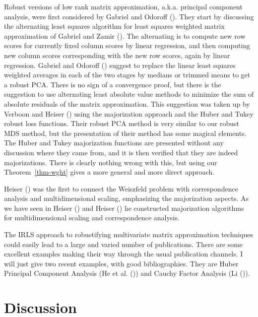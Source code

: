 \documentclass[
  12pt,
  letterpaper,
  DIV=11,
  numbers=noendperiod]{scrartcl}
\newcommand{\sectionbreak}{\pagebreak}
\theoremstyle{plain}
\theoremstyle{plain}
\theoremstyle{plain}
\theoremstyle{definition}
\theoremstyle{definition}
\theoremstyle{remark}
\begin{document}
Robust versions of low rank matrix approximation, a.k.a. principal
component analysis, were first considered by Gabriel and Odoroff
(). They start by discussing the
alternating least squares algorithm for least squares weighted matrix
approximation of Gabriel and Zamir
(). The alternating is to compute
new row scores for currently fixed column scores by linear regression,
and then computing new column scores corresponding with the new row
scores, again by linear regression. Gabriel and Odoroff
() suggest to replace the linear
least squares weighted averages in each of the two stages by medians or
trimmed means to get a robust PCA. There is no sign of a convergence
proof, but there is the suggestion to use alternating least absolute
value methods to minimize the sum of absolute residuals of the matrix
approximation. This suggestion was taken up by Verboon and Heiser
() using the majorization approach
and the Huber and Tukey robust loss functions. Their robust PCA method
is very similar to our robust MDS method, but the presentation of their
method has some magical elements. The Huber and Tukey majorization
functions are presented without any discussion where they came from, and
it is then verified that they are indeed majorizations. There is clearly
nothing wrong with this, but using our Theorem~\ref{thm-wght} gives a
more general and more direct approach.

Heiser () was the first to connect the
Weiszfeld problem with correspondence analysis and multidimensional
scaling, emphasizing the majorization aspects. As we have seen in Heiser
() and Heiser
() he constructed majorization algorithms
for multidimensional scaling and correspondence analysis.

The IRLS approach to robustifying multivariate matrix approximation
techniques could easily lead to a large and varied number of
publications. There are some excellent examples making their way through
the usual publication channels. I will just give two recent examples,
with good bibliographies. They are Huber Principal Component Analysis
(He et al. ()) and Cauchy Factor
Analysis (Li ()).

\sectionbreak

\section{Discussion}\label{discussion}
\end{document}
